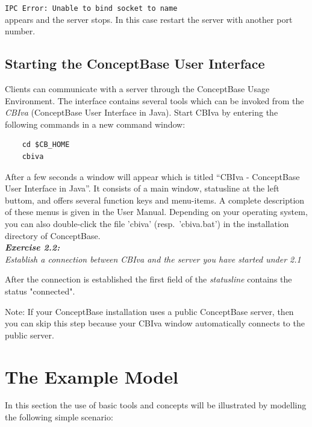 \documentclass[10pt,a4paper]{article}
\begin{document}
{\tt IPC Error: Unable to bind socket to name } \\

appears and the server stops.
In this case restart the server with another port number.

\subsection{Starting the ConceptBase User Interface}

Clients can communicate with a server through the ConceptBase Usage
Environment. The interface contains several tools which can be invoked
from the {\em CBIva\/} (ConceptBase User Interface in Java). Start CBIva
by entering the following commands in a new command window:

\begin{verbatim}
    cd $CB_HOME
    cbiva
\end{verbatim}

After a few seconds a window will appear which
is titled ``CBIva - ConceptBase User Interface in Java''. It consists of a main window, statusline
at the left buttom, and offers several function keys and menu-items.  A complete description of
these menus is given in the User Manual. Depending on your operating system, you can also
double-click the file 'cbiva' (resp.\ 'cbiva.bat') in the installation directory of ConceptBase. \\

\vspace{0.7cm}
{\it
{\bf Exercise 2.2:}\\
Establish a connection between CBIva and
the server you have started under 2.1 \\
}

After the connection is established
the first field of the {\em statusline} contains the status "connected".

\newline
{\scriptsize
Note: If your ConceptBase installation uses a public ConceptBase server,
then you can skip this step because your CBIva window automatically
connects to the public server.}



\section{The Example Model}

In this section the use of basic tools and concepts will be illustrated
by modelling the following simple scenario:
\end{document}
